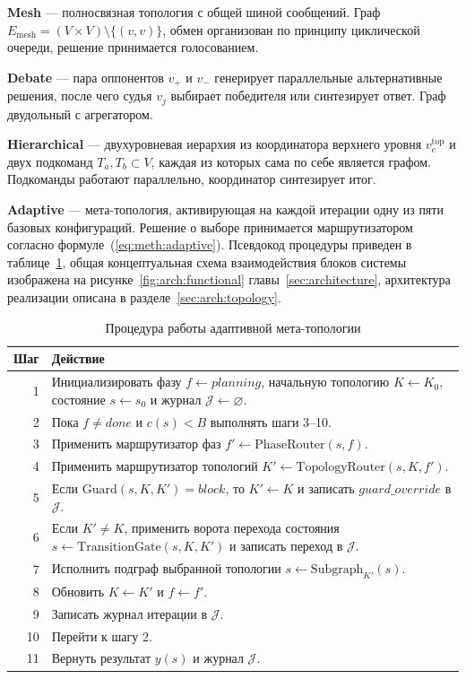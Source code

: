 \textbf{Mesh} --- полносвязная топология с общей шиной сообщений.
Граф $E_{\text{mesh}} = (V \times V) \setminus \{(v,v)\}$, обмен
организован по принципу циклической очереди, решение принимается
голосованием.

\textbf{Debate} --- пара оппонентов $v_+$ и $v_-$ генерирует
параллельные альтернативные решения, после чего судья $v_j$
выбирает победителя или синтезирует ответ. Граф двудольный
с агрегатором.

\textbf{Hierarchical} --- двухуровневая иерархия из координатора
верхнего уровня $v_c^{\text{top}}$ и двух подкоманд
$T_a, T_b \subset V$, каждая из которых сама по себе является
графом. Подкоманды работают параллельно, координатор синтезирует
итог.

\textbf{Adaptive} --- мета-топология, активирующая на каждой
итерации одну из пяти базовых конфигураций. Решение о выборе
принимается маршрутизатором согласно
формуле~(\ref{eq:meth:adaptive}). Псевдокод процедуры приведен
в таблице~\ref{tab:meth:adaptive}, общая концептуальная схема
взаимодействия блоков системы изображена на
рисунке~\ref{fig:arch:functional} главы~\ref{sec:architecture},
архитектура реализации описана в разделе~\ref{sec:arch:topology}.

\begin{table}[!htbp]
\caption{Процедура работы адаптивной мета-топологии}
\label{tab:meth:adaptive}
\small
\begin{tabularx}{\textwidth}{r X}
\toprule
\textbf{Шаг} & \textbf{Действие} \\
\midrule
1  & Инициализировать фазу $f \leftarrow planning$, начальную
     топологию $K \leftarrow K_0$, состояние $s \leftarrow s_0$
     и журнал $\mathcal{J} \leftarrow \varnothing$. \\
2  & Пока $f \neq done$ и $c(s) < B$ выполнять шаги 3--10. \\
3  & Применить маршрутизатор фаз
     $f' \leftarrow \mathrm{PhaseRouter}(s, f)$. \\
4  & Применить маршрутизатор топологий
     $K' \leftarrow \mathrm{TopologyRouter}(s, K, f')$. \\
5  & Если $\mathrm{Guard}(s, K, K') = \mathit{block}$, то
     $K' \leftarrow K$ и записать $\mathit{guard\_override}$
     в $\mathcal{J}$. \\
6  & Если $K' \neq K$, применить ворота перехода состояния
     $s \leftarrow \mathrm{TransitionGate}(s, K, K')$ и записать
     переход в $\mathcal{J}$. \\
7  & Исполнить подграф выбранной топологии
     $s \leftarrow \mathrm{Subgraph}_{K'}(s)$. \\
8  & Обновить $K \leftarrow K'$ и $f \leftarrow f'$. \\
9  & Записать журнал итерации в $\mathcal{J}$. \\
10 & Перейти к шагу 2. \\
11 & Вернуть результат $y(s)$ и журнал $\mathcal{J}$. \\
\bottomrule
\end{tabularx}
\end{table}

